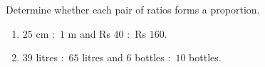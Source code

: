 Determine whether each pair of ratios forms a proportion.
\begin{enumerate}
\item[(i)] $25$ cm $:$ $1$ m and Rs $40$ $:$ Rs $160$.
\item[(ii)] $39$ litres $:$ $65$ litres and $6$ bottles $:$ $10$ bottles.
\end{enumerate}
